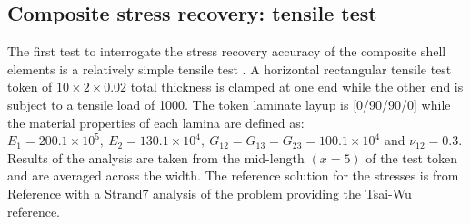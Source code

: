 \subsection{Composite stress recovery: tensile test}
The first test to interrogate the stress recovery accuracy of the composite shell elements is a relatively simple tensile test \cite{nasanettles1994}. A horizontal rectangular tensile test token of $10\times2\times0.02$ total thickness is clamped at one end while the other end is subject to a tensile load of 1000. The token laminate layup is [0/90/90/0] while the material properties of each lamina are defined as: $E_1 = 200.1\times10^5,\ E_2 = 130.1\times10^4,\ G_{12} = G_{13} = G_{23} = 100.1\times10^4$ and $\nu_{12} = 0.3$. Results of the analysis are taken from the mid-length $(x=5)$ of the test token and are averaged across the width. The reference solution for the stresses is from Reference \cite{nasanettles1994} with a Strand7 analysis of the problem providing the Tsai-Wu reference. 

